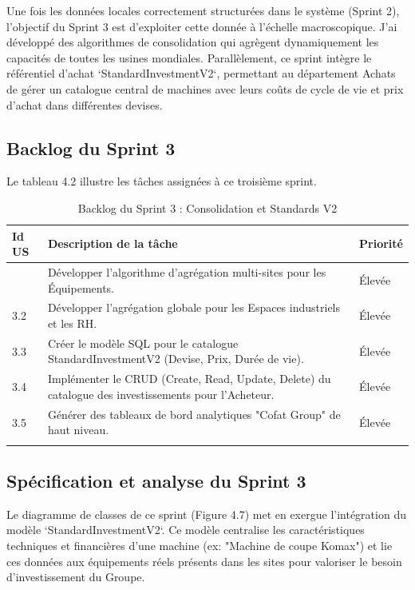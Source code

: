 Une fois les données locales correctement structurées dans le système (Sprint 2), l'objectif du Sprint 3 est d'exploiter cette donnée à l'échelle macroscopique. J'ai développé des algorithmes de consolidation qui agrègent dynamiquement les capacités de toutes les usines mondiales. Parallèlement, ce sprint intègre le référentiel d'achat `StandardInvestmentV2`, permettant au département Achats de gérer un catalogue central de machines avec leurs coûts de cycle de vie et prix d'achat dans différentes devises.

\subsection{Backlog du Sprint 3}

Le tableau 4.2 illustre les tâches assignées à ce troisième sprint.

\begin{longtable}{|m{1.5cm}|m{10cm}|m{2cm}|}
    \hline 
    \textbf{Id US} & \textbf{Description de la tâche} & \textbf{Priorité}\\
    \hline
    \endhead
    \hline
    \endfoot
    \endlastfoot
    \hline  
    3.1 & Développer l'algorithme d'agrégation multi-sites pour les Équipements. & Élevée \\
    \hline
    3.2 & Développer l'agrégation globale pour les Espaces industriels et les RH. & Élevée \\
    \hline
    3.3 & Créer le modèle SQL pour le catalogue StandardInvestmentV2 (Devise, Prix, Durée de vie). & Élevée \\
    \hline
    3.4 & Implémenter le CRUD (Create, Read, Update, Delete) du catalogue des investissements pour l'Acheteur. & Élevée \\
    \hline
    3.5 & Générer des tableaux de bord analytiques "Cofat Group" de haut niveau. & Élevée \\
    \hline
    \captionsetup{justification=centering,margin=1.5cm}
    \caption{Backlog du Sprint 3 : Consolidation et Standards V2}
\end{longtable}

\subsection{Spécification et analyse du Sprint 3}

Le diagramme de classes de ce sprint (Figure 4.7) met en exergue l'intégration du modèle `StandardInvestmentV2`. Ce modèle centralise les caractéristiques techniques et financières d'une machine (ex: "Machine de coupe Komax") et lie ces données aux équipements réels présents dans les sites pour valoriser le besoin d'investissement du Groupe.

